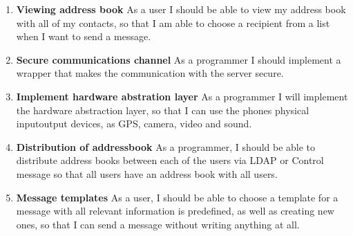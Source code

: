 \begin{enumerate}
			\item {\bf Viewing address book} As a user I should be able to view my address book with all of my contacts, so that I am able to choose a recipient from a list when I want to send a message.
			\item {\bf Secure communications channel} As a programmer I should implement a wrapper that makes the communication with the server secure.
			\item {\bf Implement hardware abstration layer} As a programmer I will implement the hardware abstraction layer, so that I can use the phones physical input\/output devices, as GPS, camera, video and sound.
			\item {\bf Distribution of addressbook} As a programmer, I should be able to distribute address books between each of the users via LDAP or Control message so that all users have an address book with all users.
			\item {\bf Message templates} As a user, I should be able to choose a template for a message with all relevant information is predefined, as well as creating new ones, so that I can send a message without writing anything at all.
		\end{enumerate}